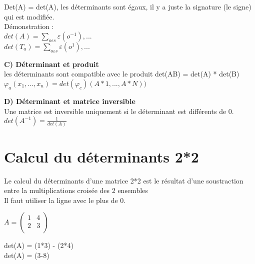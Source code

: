Det(A) = det(A), les déterminants sont égaux, il y a juste la signature (le signe) qui est modifiée.\\

Démonstration :\\

$det(A) = \sum_{o \varepsilon s} \varepsilon (o^{-1}), ...$\\

$det(T_{a}) = \sum_{o \varepsilon s} \varepsilon (o^{1}), ...$

\vspace{6mm} %
\textbf{C) Déterminant et produit} \\

les déterminants sont compatible avec le produit det(AB) = det(A) * det(B) \\

$\varphi_{a} (x_{1}, ..., x_{n}) = det(\varphi_{c}) (A*1, ..., A*N))$

\vspace{6mm} %
\textbf{D) Déterminant et matrice inversible} \\

Une matrice est inversible uniquement si le déterminant est différents de 0. \\

$det(A^{-1}) = \frac{1}{det(A)}$

\section{Calcul du déterminants 2*2}
\vspace{5mm} %
Le calcul du déterminants d'une matrice 2*2 est le résultat d'une soustraction entre la multiplications croisée des 2 ensembles \\
Il faut utiliser la ligne avec le plus de 0.

\vspace{5mm} %

$
A =
\begin{pmatrix}
  1 & 4 \\
  2 & 3 \\
\end{pmatrix}
$

\vspace{5mm} %

det(A) = (1*3) - (2*4)\\

det(A) = (3-8)\\

